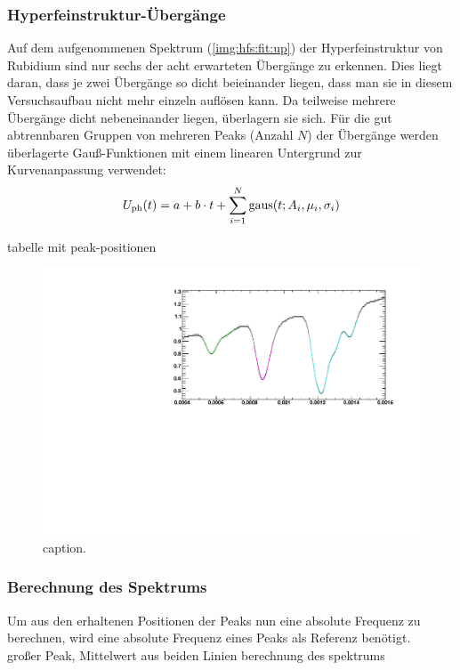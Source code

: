 \subsubsection*{Hyperfeinstruktur-Übergänge}
Auf dem aufgenommenen Spektrum (\autoref{img:hfs:fit:up}) der Hyperfeinstruktur von Rubidium sind nur sechs der acht erwarteten %
Übergänge zu erkennen. Dies liegt daran, dass je zwei Übergänge so dicht beieinander liegen, dass man sie in diesem Versuchsaufbau nicht mehr 
einzeln auflösen kann. Da teilweise mehrere Übergänge dicht nebeneinander liegen, überlagern sie sich. Für die gut abtrennbaren Gruppen von 
mehreren Peaks (Anzahl $N$) der Übergänge werden überlagerte Gauß-Funktionen mit einem linearen Untergrund zur Kurvenanpassung verwendet:
\begin{equation}
    U_\text{ph}(t) = a + b \cdot t + \sum_{i=1}^N \operatorname{gaus}(t; A_i, \mu_i, \sigma_i)
\end{equation}

tabelle mit peak-positionen \\

\begin{figure}[H]
\begin{center}
  \includegraphics[width=\textwidth]{../img/part2/up-hfs_zoom_fit.pdf}  %
  \caption{caption.}
  \label{img:hfs:fit:up}
\end{center}
\end{figure}

\subsubsection*{Berechnung des Spektrums}
Um aus den erhaltenen Positionen der Peaks nun eine absolute Frequenz zu berechnen, wird eine absolute Frequenz eines Peaks als Referenz 
benötigt. \\
großer Peak, Mittelwert aus beiden Linien
berechnung des spektrums 

